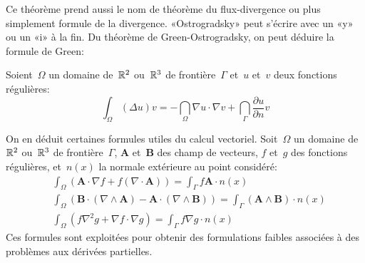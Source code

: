 \medskip
Ce théorème prend aussi le nom de théorème du flux-divergence ou plus simplement formule de la divergence. «Ostrogradsky» peut s'écrire avec un «y» ou un «i» à la fin. Du théorème de Green-Ostrogradsky, on peut déduire la formule de Green:

\begin{theoreme}
Soient~$\Omega$ un domaine de~$\mathbb R^2$ ou~$\mathbb R^3$ de frontière~$\Gamma$ et~$u$ et~$v$ deux fonctions régulières:
\begin{equation}
\int_\Omega (\Delta u)v = -\dint_\Omega \nabla u\cdot\nabla v + \dint_\Gamma \dfrac{\partial u}{\partial n}v
\end{equation}
\end{theoreme}

\medskip
On en déduit certaines formules utiles du calcul vectoriel.
Soit~$\Omega$ un domaine de~$\mathbb R^2$ ou~$\mathbb R^3$ de frontière~$\Gamma$, $\mathbf{A}$ et~$\mathbf{B}$ des champ de vecteurs, $f$ et~$g$ des fonctions régulières, et~$n(x)$ la normale extérieure au point considéré:
\begin{align}
  &\int_\Omega \left( \mathbf{A}\cdot \nabla f + f \left(\nabla \cdot \mathbf{A}\right)\right)=
  \int_\Gamma f \mathbf{A}\cdot n(x)\\
&\int_\Omega \left( \mathbf{B}\cdot\left(\nabla \wedge \mathbf{A}\right) - \mathbf{A}\cdot \left(\nabla
\wedge \mathbf{B}\right) \right)
= \int_\Gamma \left(\mathbf{A} \wedge \mathbf{B}\right)\cdot n(x)\\
&\int_\Omega \left( f \nabla^{2} g + \nabla f \cdot \nabla g \right)
= \int_\Gamma f \nabla g \cdot n(x)
\end{align}
Ces formules sont exploitées pour obtenir des formulations faibles associées à des problèmes aux dérivées partielles. 
